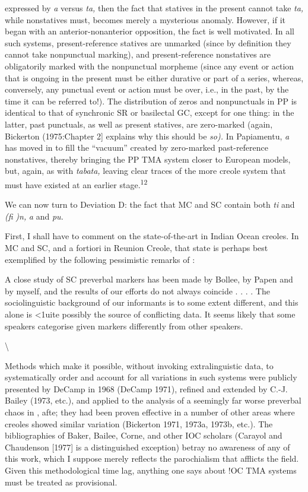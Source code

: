 
expressed by \textit{a} versus \textit{ta,} then the fact that statives in the present cannot take \textit{ta,} while nonstatives must, becomes merely a mysterious anomaly. However, if it began with an anterior-nonanterior opposition, the fact is well motivated. In all such systems, present-reference statives are unmarked (since by definition they cannot take nonpunctual mark\-ing), and present-reference nonstatives are obligatorily marked with the nonpunctual morpheme (since any event or action that is ongoing in the present must be either durative or part of a series, whereas, con\-versely, any punctual event or action must be over, i.e., in the past, by the time it can be referred to!). The distribution of zeros and nonpunctuals in PP is identical to that of synchronic SR or basilectal GC, except for one thing: in the latter, past punctuals, as well as present statives, are zero-marked (again, Bickerton (1975:Chapter 2] explains why this should be \textit{so).} In Papiamentu, \textit{a} has moved in to fill the ``vacuum'' created by zero-marked past-reference nonstatives, thereby bringing the PP TMA system closer to European models, but, again, as with \textit{tabata,} leaving clear traces of the more creole system that must have existed at an earlier stage.\textsuperscript{12}

We can now turn to Deviation D: the fact that MC and SC contain both \textit{ti} and \textit{(}\textit{fi} \textit{)n,} \textit{a} and \textit{pu.}

First, I shall have to comment on the state-of-the-art in Indian Ocean creoles. In MC and SC, and a fortiori in Reunion Creole, that state is perhaps best exemplified by the following pessimistic remarks of \citet[94-95]{Corne1977}:

A close study of SC preverbal markers has been made by Bollee, by Papen and by myself, and the results of our efforts do not always coincide . . . . The sociolinguistic background of our informants is to some extent different, and this alone is {\textless}1uite possibly the source of conflicting data. It seems likely that some speakers categorise given markers differently from other speakers.

{\textbackslash}


Methods which make it possible, without invoking extralinguistic data, to systematically order and account for all variations in such systems were publicly presented by DeCamp in 1968 (DeCamp 1971), refined and extended by C.-J. Bailey (1973, etc.), and applied to the analysis of a seemingly far worse preverbal chaos in \citet{Bickerton1975}, afte; they had been proven effective in a number of other areas where creoles showed similar variation (Bickerton 1971, 1973a, 1973b, etc.). The bibliographies of Baker, Bailee, Corne, and other IOC scholars (Carayol and Chaudenson [1977] is a distinguished exception) betray no awareness of any of this work, which I suppose merely reflects the parochialism that afflicts the field. Given this methodological time lag, anything one says about !OC TMA systems must be treated as provisional.

